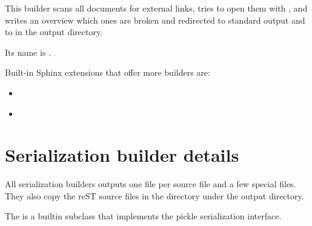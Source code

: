 \documentclass[letterpaper,10pt,english]{sphinxmanual}
\begin{document}
\label{builders:module-sphinx.builders.linkcheck}

\begin{fulllineitems}
\label{builders:sphinx.builders.linkcheck.CheckExternalLinksBuilder}
This builder scans all documents for external links, tries to open them with
, and writes an overview which ones are broken and redirected
to standard output and to  in the output directory.

Its name is .

\end{fulllineitems}


Built-in Sphinx extensions that offer more builders are:
\begin{itemize}
\item {} 
{\hyperref[ext/doctest:module\string-sphinx.ext.doctest]{}}

\item {} 
{\hyperref[ext/coverage:module\string-sphinx.ext.coverage]{}}

\end{itemize}


\section{Serialization builder details}
\label{builders:serialization-builder-details}\label{builders:serialization-details}
All serialization builders outputs one file per source file and a few special
files.  They also copy the reST source files in the directory 
under the output directory.

The {\hyperref[builders:sphinx.builders.html.PickleHTMLBuilder]{}} is a builtin subclass that implements the pickle
serialization interface.
\end{document}
